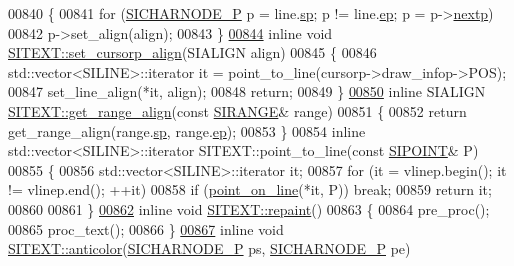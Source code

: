 \begin{DoxyCode}
00840 \{
00841     \textcolor{keywordflow}{for} (\hyperlink{class_s_i_c_h_a_r_n_o_d_e}{SICHARNODE\_P} p = line.\hyperlink{struct_s_i_r_a_n_g_e_a7acdf296d873d6ed6fc203674109b715}{sp}; p != line.\hyperlink{struct_s_i_r_a_n_g_e_aaa89b5ae16be7b890eba048bc212feec}{ep}; p = p->\hyperlink{class_s_i_c_h_a_r_n_o_d_e_ab188ae5c7731bcc66a1042defcf158c8}{nextp})
00842         p->set\_align(align);
00843 \}
\hyperlink{class_s_i_t_e_x_t_a1717bc1a3f8d797fc52654ffb7aafb87}{00844} \textcolor{keyword}{inline} \textcolor{keywordtype}{void} \hyperlink{class_s_i_t_e_x_t_a1717bc1a3f8d797fc52654ffb7aafb87}{SITEXT::set\_cursorp\_align}(SIALIGN align)
00845 \{
00846     std::vector<SILINE>::iterator it = point\_to\_line(cursorp->draw\_infop->POS);
00847     set\_line\_align(*it, align);
00848     \textcolor{keywordflow}{return};
00849 \}
\hyperlink{class_s_i_t_e_x_t_a53c41b86be047c49946fab50ef79563b}{00850} \textcolor{keyword}{inline} SIALIGN \hyperlink{class_s_i_t_e_x_t_a43b43ba8dc025b49555f527734508465}{SITEXT::get\_range\_align}(\textcolor{keyword}{const} \hyperlink{struct_s_i_r_a_n_g_e}{SIRANGE}& range)
00851 \{
00852     \textcolor{keywordflow}{return} get\_range\_align(range.\hyperlink{struct_s_i_r_a_n_g_e_a7acdf296d873d6ed6fc203674109b715}{sp}, range.\hyperlink{struct_s_i_r_a_n_g_e_aaa89b5ae16be7b890eba048bc212feec}{ep});
00853 \}
00854 \textcolor{keyword}{inline} std::vector<SILINE>::iterator SITEXT::point\_to\_line(\textcolor{keyword}{const} \hyperlink{struct_s_i_p_o_i_n_t}{SIPOINT}& P)
00855 \{
00856     std::vector<SILINE>::iterator it;
00857     \textcolor{keywordflow}{for} (it = vlinep.begin(); it != vlinep.end(); ++it)
00858         \textcolor{keywordflow}{if} (\hyperlink{kernal_8h_ae39165f0f00583edee6fe18ea6bdf5e3}{point\_on\_line}(*it, P)) \textcolor{keywordflow}{break};
00859     \textcolor{keywordflow}{return} it;
00860 
00861 \}
\hyperlink{class_s_i_t_e_x_t_a944194c2df3c4ba2c599de6fbe0f98c2}{00862} \textcolor{keyword}{inline} \textcolor{keywordtype}{void} \hyperlink{class_s_i_t_e_x_t_a944194c2df3c4ba2c599de6fbe0f98c2}{SITEXT::repaint}()
00863 \{
00864     pre\_proc();
00865     proc\_text();
00866 \}
\hyperlink{class_s_i_t_e_x_t_af62ce4105e9450cc8c2319fed9fa7218}{00867} \textcolor{keyword}{inline} \textcolor{keywordtype}{void} \hyperlink{class_s_i_t_e_x_t_af62ce4105e9450cc8c2319fed9fa7218}{SITEXT::anticolor}(\hyperlink{class_s_i_c_h_a_r_n_o_d_e}{SICHARNODE\_P} ps, 
      \hyperlink{class_s_i_c_h_a_r_n_o_d_e}{SICHARNODE\_P} pe)

\end{DoxyCode}
